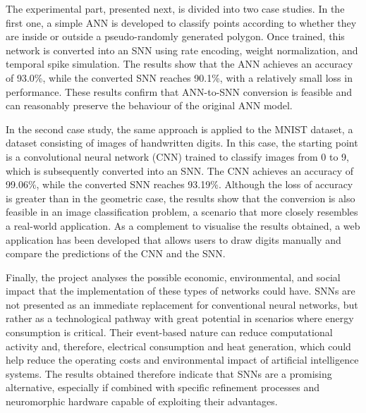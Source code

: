 \documentclass[a4paper,11pt, titlepage, twoside]{article}
\begin{document}
The experimental part, presented next, is divided into two case studies. In the first one, a simple ANN is developed to classify points according to whether they are inside or outside a pseudo-randomly generated polygon. Once trained, this network is converted into an SNN using rate encoding, weight normalization, and temporal spike simulation. The results show that the ANN achieves an accuracy of 93.0\%, while the converted SNN reaches 90.1\%, with a relatively small loss in performance. These results confirm that ANN-to-SNN conversion is feasible and can reasonably preserve the behaviour of the original ANN model.

In the second case study, the same approach is applied to the MNIST dataset, a dataset consisting of images of handwritten digits. In this case, the starting point is a convolutional neural network (CNN) trained to classify images from 0 to 9, which is subsequently converted into an SNN. The CNN achieves an accuracy of 99.06\%, while the converted SNN reaches 93.19\%. Although the loss of accuracy is greater than in the geometric case, the results show that the conversion is also feasible in an image classification problem, a scenario that more closely resembles a real-world application. As a complement to visualise the results obtained, a web application has been developed that allows users to draw digits manually and compare the predictions of the CNN and the SNN.

Finally, the project analyses the possible economic, environmental, and social impact that the implementation of these types of networks could have. SNNs are not presented as an immediate replacement for conventional neural networks, but rather as a technological pathway with great potential in scenarios where energy consumption is critical. Their event-based nature can reduce computational activity and, therefore, electrical consumption and heat generation, which could help reduce the operating costs and environmental impact of artificial intelligence systems. The results obtained therefore indicate that SNNs are a promising alternative, especially if combined with specific refinement processes and neuromorphic hardware capable of exploiting their advantages.
\clearpage
\end{document}
